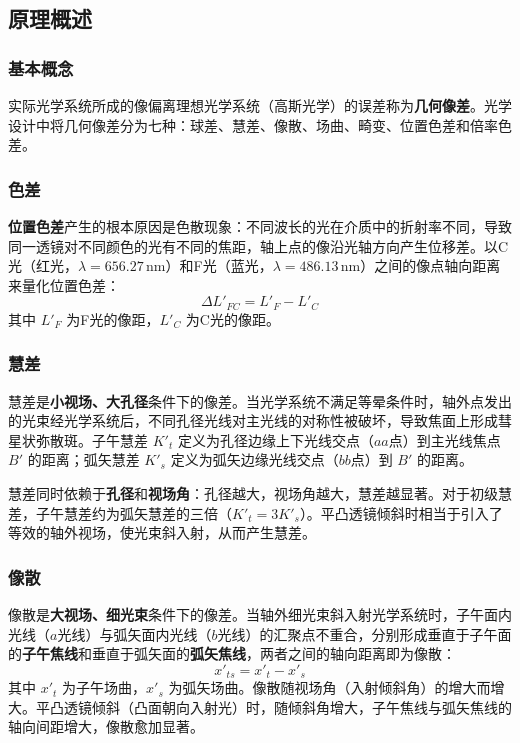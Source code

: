 \documentclass[dvipsnames, svgnames,a4paper,11pt]{article}
\begin{document}
\subsection{原理概述}

\subsubsection{基本概念}

实际光学系统所成的像偏离理想光学系统（高斯光学）的误差称为\textbf{几何像差}。光学设计中将几何像差分为七种：球差、慧差、像散、场曲、畸变、位置色差和倍率色差。

\subsubsection{色差}

\textbf{位置色差}产生的根本原因是色散现象：不同波长的光在介质中的折射率不同，导致同一透镜对不同颜色的光有不同的焦距，轴上点的像沿光轴方向产生位移差。以C光（红光，$\lambda = 656.27\,\text{nm}$）和F光（蓝光，$\lambda = 486.13\,\text{nm}$）之间的像点轴向距离来量化位置色差：
\begin{equation}
	\Delta L'_{FC} = L'_F - L'_C
\end{equation}
其中 $L'_F$ 为F光的像距，$L'_C$ 为C光的像距。

\subsubsection{慧差}

慧差是\textbf{小视场、大孔径}条件下的像差。当光学系统不满足等晕条件时，轴外点发出的光束经光学系统后，不同孔径光线对主光线的对称性被破坏，导致焦面上形成彗星状弥散斑。子午慧差 $K'_t$ 定义为孔径边缘上下光线交点（$aa$点）到主光线焦点 $B'$ 的距离；弧矢慧差 $K'_s$ 定义为弧矢边缘光线交点（$bb$点）到 $B'$ 的距离。

慧差同时依赖于\textbf{孔径}和\textbf{视场角}：孔径越大，视场角越大，慧差越显著。对于初级慧差，子午慧差约为弧矢慧差的三倍（$K'_t = 3K'_s$）。平凸透镜倾斜时相当于引入了等效的轴外视场，使光束斜入射，从而产生慧差。

\subsubsection{像散}

像散是\textbf{大视场、细光束}条件下的像差。当轴外细光束斜入射光学系统时，子午面内光线（$a$光线）与弧矢面内光线（$b$光线）的汇聚点不重合，分别形成垂直于子午面的\textbf{子午焦线}和垂直于弧矢面的\textbf{弧矢焦线}，两者之间的轴向距离即为像散：
\begin{equation}
	x'_{ts} = x'_t - x'_s
\end{equation}
其中 $x'_t$ 为子午场曲，$x'_s$ 为弧矢场曲。像散随视场角（入射倾斜角）的增大而增大。平凸透镜倾斜（凸面朝向入射光）时，随倾斜角增大，子午焦线与弧矢焦线的轴向间距增大，像散愈加显著。
\end{document}
